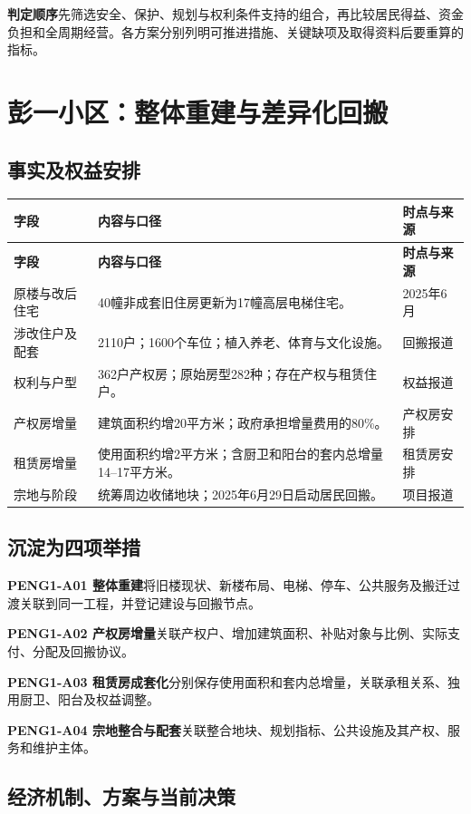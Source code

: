 \documentclass[UTF8,11pt,fontset=windows]{ctexart}
\newcommand{\field}[2]{\par\noindent\textbf{#1}\quad #2\par}
\begin{document}
\field{判定顺序}{先筛选安全、保护、规划与权利条件支持的组合，再比较居民得益、资金负担和全周期经营。各方案分别列明可推进措施、关键缺项及取得资料后要重算的指标。}

\clearpage
\section{彭一小区：整体重建与差异化回搬}

\subsection{事实及权益安排}

\begin{longtable}{@{}L{40mm}L{85mm}L{34mm}@{}}
\toprule\textbf{字段} & \textbf{内容与口径} & \textbf{时点与来源}\\\midrule
\endfirsthead
\toprule\textbf{字段} & \textbf{内容与口径} & \textbf{时点与来源}\\\midrule
\endhead
原楼与改后住宅 & 40幢非成套旧住房更新为17幢高层电梯住宅。 & 2025年6月\cite{S01}\\
涉改住户及配套 & 2110户；1600个车位；植入养老、体育与文化设施。 & 回搬报道\cite{S01}\\
权利与户型 & 362户产权房；原始房型282种；存在产权与租赁住户。 & 权益报道\cite{S02}\\
产权房增量 & 建筑面积约增20平方米；政府承担增量费用的80\%。 & 产权房安排\cite{S02}\\
租赁房增量 & 使用面积约增2平方米；含厨卫和阳台的套内总增量14--17平方米。 & 租赁房安排\cite{S02}\\
宗地与阶段 & 统筹周边收储地块；2025年6月29日启动居民回搬。 & 项目报道\cite{S01}\\
\bottomrule
\end{longtable}

\subsection{沉淀为四项举措}

\field{PENG1-A01 整体重建}{将旧楼现状、新楼布局、电梯、停车、公共服务及搬迁过渡关联到同一工程，并登记建设与回搬节点。}
\field{PENG1-A02 产权房增量}{关联产权户、增加建筑面积、补贴对象与比例、实际支付、分配及回搬协议。}
\field{PENG1-A03 租赁房成套化}{分别保存使用面积和套内总增量，关联承租关系、独用厨卫、阳台及权益调整。}
\field{PENG1-A04 宗地整合与配套}{关联整合地块、规划指标、公共设施及其产权、服务和维护主体。}

\subsection{经济机制、方案与当前决策}
\end{document}
